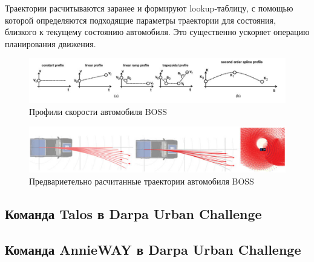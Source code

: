 Траектории расчитываются заранее и формируют lookup-таблицу, с помощью которой определяются подходящие параметры траектории
для состояния, близкого к текущему состоянию автомобиля. Это существенно ускоряет операцию планирования движения.

\begin{figure}[h]
    \centering
    \includegraphics[width=\linewidth]{images/boss_velocity_prifiles}
    \caption{Профили скорости автомобиля BOSS}
    \label{img:boss_velocity_prifiles}
\end{figure}


\begin{figure}[h]
    \centering
    \includegraphics[width=\linewidth]{images/boss_lattice_gen}
    \caption{Предвариетельно расчитанные траектории автомобиля BOSS}
    \label{img:boss_lattice_gen}
\end{figure}

\subsection{Команда Talos в Darpa Urban Challenge}
\subsection{Команда AnnieWAY в Darpa Urban Challenge}